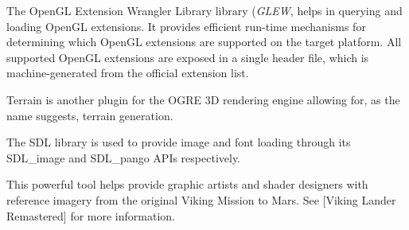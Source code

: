 The OpenGL Extension Wrangler Library library ({\it GLEW}, helps in querying and loading OpenGL extensions. It provides efficient run-time mechanisms for determining which OpenGL extensions are supported on the target platform. All supported OpenGL extensions are exposed in a single header file, which is machine-generated from the official extension list.


Terrain is another plugin for the OGRE 3D rendering engine allowing for, as the name suggests, terrain generation.


The SDL library is used to provide image and font loading through its SDL_image and SDL_pango APIs respectively.


This powerful tool helps provide graphic artists and shader designers with reference imagery from the original Viking Mission to Mars. See [Viking Lander Remastered] for more information.
\stopitemize

